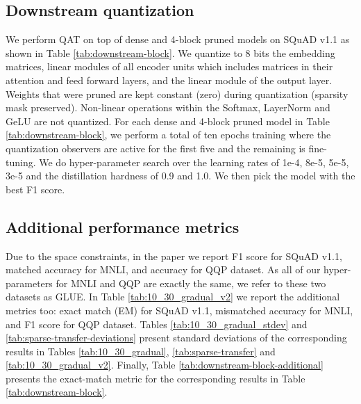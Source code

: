 \documentclass[11pt]{article}
\begin{document}
\subsection{Downstream quantization}
\label{app:hyperparams-DownstreamQuantization}

We perform QAT on top of dense and 4-block pruned models on SQuAD v1.1 as shown in Table \ref{tab:downstream-block}. We quantize to 8 bits the embedding matrices, linear modules of all encoder units which includes matrices in their attention and feed forward layers, and the linear module of the output layer. Weights that were pruned are kept constant (zero) during quantization (sparsity mask preserved). Non-linear operations within the Softmax, LayerNorm and GeLU are not quantized. For each dense and 4-block pruned model in Table \ref{tab:downstream-block}, we perform a total of ten epochs training where the quantization observers are active for the first five and the remaining is fine-tuning. We do hyper-parameter search over the learning rates of 1e-4, 8e-5, 5e-5, 3e-5 and the distillation hardness of 0.9 and 1.0. We then pick the model with the best F1 score.

\subsection{Additional performance metrics}
Due to the space constraints, in the paper we report F1 score for SQuAD v1.1, matched accuracy for MNLI, and accuracy for QQP dataset. As all of our hyper-parameters for MNLI and QQP are exactly the same, we refer to these two datasets as GLUE. In Table \ref{tab:10_30_gradual_v2} we report the additional metrics too: exact match (EM) for SQuAD v1.1, mismatched accuracy for MNLI, and F1 score for QQP dataset. Tables \ref{tab:10_30_gradual_stdev} and \ref{tab:sparse-transfer-deviations} present standard deviations of the corresponding results in Tables \ref{tab:10_30_gradual}, \ref{tab:sparse-transfer} and \ref{tab:10_30_gradual_v2}. Finally, Table \ref{tab:downstream-block-additional} presents the exact-match metric for the corresponding results in Table \ref{tab:downstream-block}.
\end{document}
